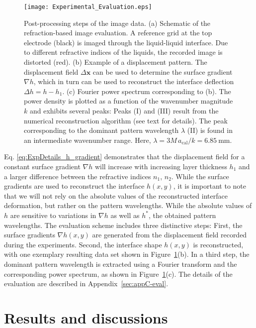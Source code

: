 \documentclass{jfm_arxiv}
\renewcommand\vec{\mathbf}
\begin{document}
\begin{figure}
  \centerline{\texttt{[image: Experimental\_Evaluation.eps]}}%
  \caption{Post-processing steps of the image data. (a) Schematic of the refraction-based image evaluation. A reference grid at the top electrode (black) is imaged through the liquid-liquid interface. Due to different refractive indices of the liquids, the recorded image is distorted (red). (b) Example of a displacement pattern. The displacement field $\Delta \vec{x}$ can be used to determine the surface gradient $\nabla h$, which in turn can be used to reconstruct the interface deflection $\Delta h = h-h_1$. (c) Fourier power spectrum corresponding to (b). The power density is plotted as a function of the wavenumber magnitude $k$ and exhibits several peaks: Peaks (I) and (III) result from the numerical reconstruction algorithm (see text for details). The peak corresponding to the dominant pattern wavelength $\lambda$ (II) is found in an intermediate wavenumber range. Here, $\lambda = 3M\, a_\text{cal} /k = \SI{6.85}{\milli\meter}$.}
\label{fig:experimentalEval}
\end{figure}

Eq. \eqref{eq:ExpDetails_h_gradient} demonstrates that the displacement field for a constant surface gradient $\nabla h$ will increase with increasing layer thickness $h_1$ and a larger difference between the refractive indices $n_1$, $n_2$. While the surface gradients are used to reconstruct the interface $h(x,y)$, it is important to note that we will not rely on the absolute values of the reconstructed interface deformation, but rather on the pattern wavelengths. While the absolute values of $h$ are sensitive to variations in $\nabla h$ as well as $h^*$, the obtained pattern wavelengths. The evaluation scheme includes three distinctive steps: First, the surface gradients $\nabla h(x,y)$ are generated from the displacement field recorded during the experiments.
Second, the interface shape $h(x,y)$ is reconstructed, with one exemplary resulting data set shown in Figure~\ref{fig:experimentalEval}(b).
In a third step, the dominant pattern wavelength is extracted using a Fourier transform and the corresponding power spectrum, as shown in Figure~\ref{fig:experimentalEval}(c).
The details of the evaluation are described in Appendix~\ref{sec:appC-eval}. 

\section{Results and discussions}
\label{sec:results}
\end{document}
